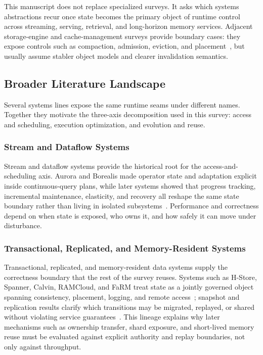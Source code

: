 ﻿\documentclass[manuscript]{acmart}
\begin{document}
This manuscript does not replace specialized surveys. It asks which systems abstractions recur once state becomes the primary object of runtime control across streaming, serving, retrieval, and long-horizon memory services. Adjacent storage-engine and cache-management surveys provide boundary cases: they expose controls such as compaction, admission, eviction, and placement~\cite{luo2020lsm,ali2011survey}, but usually assume stabler object models and clearer invalidation semantics.

\subsection{Broader Literature Landscape}

Several systems lines expose the same runtime seams under different names. Together they motivate the three-axis decomposition used in this survey: access and scheduling, execution optimization, and evolution and reuse.

\subsubsection{Stream and Dataflow Systems}

Stream and dataflow systems provide the historical root for the access-and-scheduling axis. Aurora and Borealis made operator state and adaptation explicit inside continuous-query plans, while later systems showed that progress tracking, incremental maintenance, elasticity, and recovery all reshape the same state boundary rather than living in isolated subsystems~\cite{abadi2003aurora,abadi2005borealis,carbone2015flink,carbone2015asynchronous,chandramouli2014trill,armbrust2018structured,murray2013differential,gulisano2012streamcloud}. Performance and correctness depend on when state is exposed, who owns it, and how safely it can move under disturbance.

\subsubsection{Transactional, Replicated, and Memory-Resident Systems}

Transactional, replicated, and memory-resident data systems supply the correctness boundary that the rest of the survey reuses. Systems such as H-Store, Spanner, Calvin, RAMCloud, and FaRM treat state as a jointly governed object spanning consistency, placement, logging, and remote access~\cite{kallman2008hstore,corbett2012spanner,thomson2012calvin,ousterhout2011ramcloud,dragojevic2014farm}; snapshot and replication results clarify which transitions may be migrated, replayed, or shared without violating service guarantees~\cite{chandy1985snapshot,ongaro2014raft}. This lineage explains why later mechanisms such as ownership transfer, shard exposure, and short-lived memory reuse must be evaluated against explicit authority and replay boundaries, not only against throughput.
\end{document}
